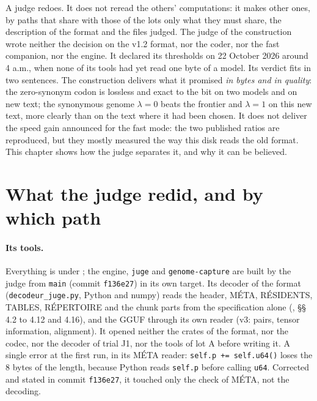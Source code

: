\begin{enbref}
A judge redoes. It does not reread the others' computations: it makes other ones, by paths that share with those of the lots only what they must share, the description of the format and the files judged. The judge of the construction wrote neither the decision on the v1.2 format, nor the coder, nor the fast companion, nor the engine. It declared its thresholds on 22 October 2026 around 4 a.m., when none of its tools had yet read one byte of a model. Its verdict fits in two sentences. The construction delivers what it promised \emph{in bytes and in quality}: the zero-synonym codon is lossless and exact to the bit on two models and on new text; the synonymous genome $\lambda = 0$ beats the frontier and $\lambda = 1$ on this new text, more clearly than on the text where it had been chosen. It does not deliver the speed gain announced for the fast mode: the two published ratios are reproduced, but they mostly measured the way this disk reads the old format. This chapter shows how the judge separates it, and why it can be believed.
\end{enbref}

\section{What the judge redid, and by which path}\label{t3jug:sec:chemins}

\paragraph{Its tools.} Everything is under ; the engine, \texttt{juge} and \texttt{genome-capture} are built by the judge from \texttt{main} (commit \texttt{f136e27}) in its own target. Its decoder of the format (\texttt{decodeur\_juge.py}, Python and numpy) reads the header, MÉTA, RÉSIDENTS, TABLES, RÉPERTOIRE and the chunk parts from the specification alone (, §§ 4.2 to 4.12 and 4.16), and the GGUF through its own reader (v3: pairs, tensor information, alignment). It opened neither the crates of the format, nor the codec, nor the decoder of trial J1, nor the tools of lot A before writing it. A single error at the first run, in its MÉTA reader: \texttt{self.p += self.u64()} loses the 8 bytes of the length, because Python reads \texttt{self.p} before calling \texttt{u64}. Corrected and stated in commit \texttt{f136e27}, it touched only the check of MÉTA, not the decoding.

